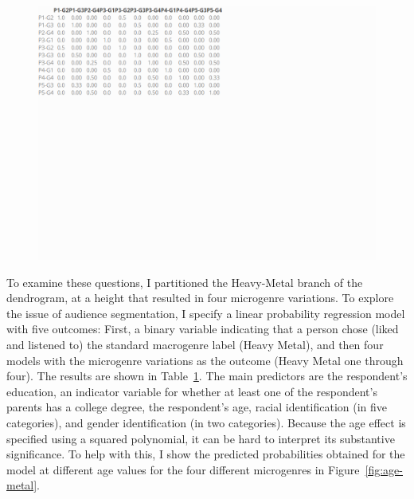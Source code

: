 \documentclass[a4paper,12pt]{extarticle}
\begin{document}
\begin{figure}[ht!]
    \centering    
    \includegraphics[width=1.5\textwidth]{Tabs/reg-tab-metal.png}
    \caption{}
    \label{tab:reg-metal}
\end{figure}
    
To examine these questions, I partitioned the Heavy-Metal branch of the dendrogram, at a height that resulted in four microgenre variations. To explore the issue of audience segmentation, I specify a linear probability regression model with five outcomes: First, a binary variable indicating that a person chose (liked and listened to) the standard macrogenre label (Heavy Metal), and then four models with the microgenre variations as the outcome (Heavy Metal one through four). The results are shown in Table~\ref{tab:reg-metal}. The main predictors are the respondent's education, an indicator variable for whether at least one of the respondent's parents has a college degree, the respondent's age, racial identification (in five categories), and gender identification (in two categories). Because the age effect is specified using a squared polynomial, it can be hard to interpret its substantive significance. To help with this, I show the predicted probabilities obtained for the model at different age values for the four different microgenres in Figure~\ref{fig:age-metal}.
\end{document}
